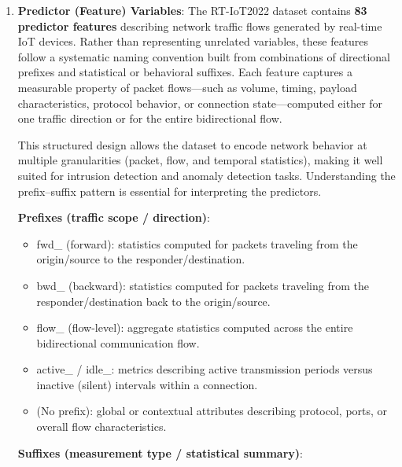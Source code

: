 \documentclass[
  letterpaper,
  DIV=11,
  numbers=noendperiod]{scrartcl}
\providecommand{\tightlist}{%
  \setlength{\itemsep}{0pt}\setlength{\parskip}{0pt}}
\begin{document}
\begin{enumerate}
\def\labelenumi{\arabic{enumi})}
\item
  \textbf{Predictor (Feature) Variables}: The RT-IoT2022 dataset
  contains \textbf{83 predictor features} describing network traffic
  flows generated by real-time IoT devices. Rather than representing
  unrelated variables, these features follow a systematic naming
  convention built from combinations of directional prefixes and
  statistical or behavioral suffixes. Each feature captures a measurable
  property of packet flows---such as volume, timing, payload
  characteristics, protocol behavior, or connection state---computed
  either for one traffic direction or for the entire bidirectional flow.

  This structured design allows the dataset to encode network behavior
  at multiple granularities (packet, flow, and temporal statistics),
  making it well suited for intrusion detection and anomaly detection
  tasks. Understanding the prefix--suffix pattern is essential for
  interpreting the predictors.

  \textbf{Prefixes (traffic scope / direction)}:

  \begin{itemize}
  \tightlist
  \item
    fwd\_ (forward): statistics computed for packets traveling from the
    origin/source to the responder/destination.
  \item
    bwd\_ (backward): statistics computed for packets traveling from the
    responder/destination back to the origin/source.
  \item
    flow\_ (flow-level): aggregate statistics computed across the entire
    bidirectional communication flow.
  \item
    active\_ / idle\_: metrics describing active transmission periods
    versus inactive (silent) intervals within a connection.
  \item
    (No prefix): global or contextual attributes describing protocol,
    ports, or overall flow characteristics.
  \end{itemize}

  \textbf{Suffixes (measurement type / statistical summary)}:


\end{enumerate}
\end{document}
